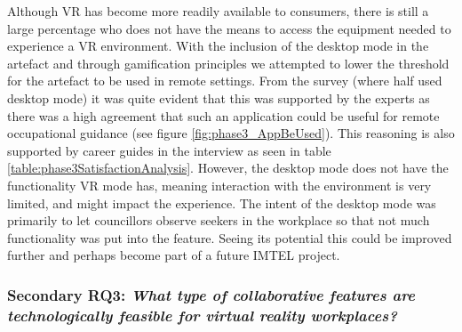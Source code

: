 
Although VR has become more readily available to consumers, there is still a large percentage who does not have the means to access the equipment needed to experience a VR environment. With the inclusion of the desktop mode in the artefact and through gamification principles we attempted to lower the threshold for the artefact to be used in remote settings. From the survey (where half used desktop mode) it was quite evident that this was supported by the experts as there was a high agreement that such an application could be useful for remote occupational guidance (see figure \ref{fig:phase3_AppBeUsed}). This reasoning is also supported by career guides in the interview as seen in table \ref{table:phase3SatisfactionAnalysis}. However, the desktop mode does not have the functionality VR mode has, meaning interaction with the environment is very limited, and might impact the experience. The intent of the desktop mode was primarily to let councillors observe seekers in the workplace so that not much functionality was put into the feature. Seeing its potential this could be improved further and perhaps become part of a future IMTEL project. 








\subsubsection{Secondary RQ3: \textit{What type of collaborative features are technologically feasible for virtual reality workplaces?}} 
\label{discussion:RQ3}


